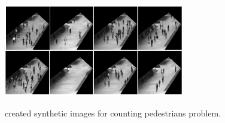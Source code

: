 \begin{enumerate}
\begin{figure}[H]
	\centering
	{\includegraphics[width=0.7\textwidth]{images/myped}}
	\caption{created synthetic images for counting pedestrians problem.}
	\label{fig:myped}
\end{figure}

\end{enumerate}

